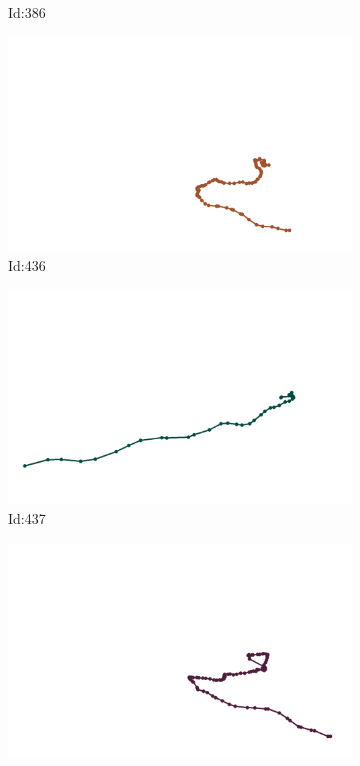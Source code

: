\documentclass[12pt,twoside]{report}
\begin{document}
\begin{figure}
\begin{subfigure}[b]{0.20\textwidth}
\caption{Id:386}
\end{subfigure}
\begin{subfigure}[b]{0.20\textwidth}
\centering
\includegraphics[width=\textwidth]{../trajectories/436.png}
\caption{Id:436}
\end{subfigure}
\begin{subfigure}[b]{0.20\textwidth}
\centering
\includegraphics[width=\textwidth]{../trajectories/437.png}
\caption{Id:437}
\end{subfigure}
\begin{subfigure}[b]{0.20\textwidth}
\centering
\includegraphics[width=\textwidth]{../trajectories/449.png}

\end{subfigure}
\end{figure}
\end{document}

